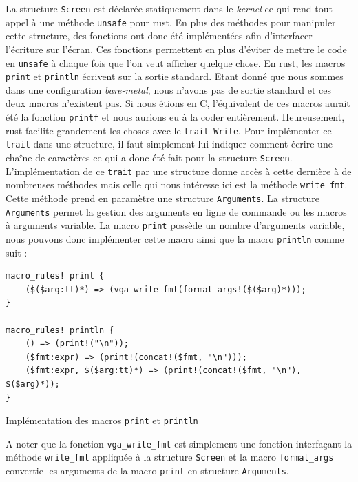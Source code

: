 La structure \texttt{Screen} est déclarée statiquement dans le \textit{kernel}
ce qui rend tout appel à une méthode \texttt{unsafe} pour rust. En plus
des méthodes pour manipuler cette structure, des fonctions ont donc été implémentées
afin d'interfacer l'écriture sur l'écran. Ces fonctions permettent en plus d'éviter
de mettre le code en \texttt{unsafe} à chaque fois que l'on veut afficher
quelque chose. En rust, les macros \texttt{print} et \texttt{println}
écrivent sur la sortie standard. Etant donné que nous sommes dans une configuration
\textit{bare-metal}, nous n'avons pas de sortie standard et ces deux macros n'existent
pas. Si nous étions en C, l'équivalent de ces macros aurait été la fonction
\texttt{printf} et nous aurions eu à la coder entièrement. Heureusement,
rust facilite grandement les choses avec le \texttt{trait Write}.
Pour implémenter ce \texttt{trait} dans une structure, il faut simplement
lui indiquer comment écrire une chaîne de caractères ce qui a donc été fait
pour la structure \texttt{Screen}. L'implémentation de ce \texttt{trait}
par une structure donne accès à cette dernière à de nombreuses méthodes mais celle
qui nous intéresse ici est la méthode \texttt{write_fmt}. Cette méthode
prend en paramètre une structure \texttt{Arguments}. La structure
\texttt{Arguments} permet la gestion des arguments en ligne de commande
ou les macros à arguments variable. La macro \texttt{print} possède
un nombre d'arguments variable, nous pouvons donc implémenter cette macro ainsi
que la macro \texttt{println} comme suit :

\begin{code}
\begin{verbatim}
macro_rules! print {
    ($($arg:tt)*) => (vga_write_fmt(format_args!($($arg)*)));
}

macro_rules! println {
    () => (print!("\n"));
    ($fmt:expr) => (print!(concat!($fmt, "\n")));
    ($fmt:expr, $($arg:tt)*) => (print!(concat!($fmt, "\n"), $($arg)*));
}
\end{verbatim}
\caption{Implémentation des macros \texttt{print} et \texttt{println}}
\label{lst:vga:print}
\end{code} \bigbreak

A noter que la fonction \texttt{vga_write_fmt} est simplement une fonction
interfaçant la méthode \texttt{write_fmt} appliquée à la structure
\texttt{Screen} et la macro \texttt{format_args} convertie
les arguments de la macro \texttt{print} en structure \texttt{Arguments}.


